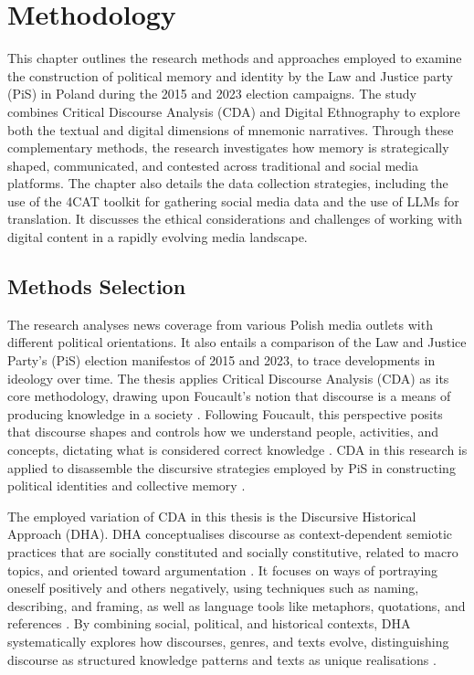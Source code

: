 \chapter[Methodology]{Methodology}
\label{Chap:Methodology}

This chapter outlines the research methods and approaches employed to examine the construction of political memory and identity by the Law and Justice party (PiS) in Poland during the 2015 and 2023 election campaigns. The study combines Critical Discourse Analysis (CDA) and Digital Ethnography to explore both the textual and digital dimensions of mnemonic narratives. Through these complementary methods, the research investigates how memory is strategically shaped, communicated, and contested across traditional and social media platforms. The chapter also details the data collection strategies, including the use of the 4CAT toolkit for gathering social media data and the use of LLMs for translation. It discusses the ethical considerations and challenges of working with digital content in a rapidly evolving media landscape.

\section{Methods Selection}

The research analyses news coverage from various Polish media outlets with different political orientations. It also entails a comparison of the Law and Justice Party's (PiS) election manifestos of 2015 and 2023, to trace developments in ideology over time. The thesis applies Critical Discourse Analysis (CDA) as its core methodology, drawing upon Foucault's notion that discourse is a means of producing knowledge in a society \citep{tracy_critical_2015}.  Following Foucault, this perspective posits that discourse shapes and controls how we understand people, activities, and concepts, dictating what is considered correct knowledge \citep{wodak_critical_2013}. CDA in this research is applied to disassemble the discursive strategies employed by PiS in constructing political identities and collective memory \citep{weiss_critical_2003}.

The employed variation of CDA in this thesis is the Discursive Historical Approach (DHA). DHA conceptualises discourse as context-dependent semiotic practices that are socially constituted and socially constitutive, related to macro topics, and oriented toward argumentation \citep{tracy_critical_2015}. It focuses on ways of portraying oneself positively and others negatively, using techniques such as naming, describing, and framing, as well as language tools like metaphors, quotations, and references \citep{wodak__2017}. By combining social, political, and historical contexts, DHA systematically explores how discourses, genres, and texts evolve, distinguishing discourse as structured knowledge patterns and texts as unique realisations \citep{reisigl_discourse_2001}.

